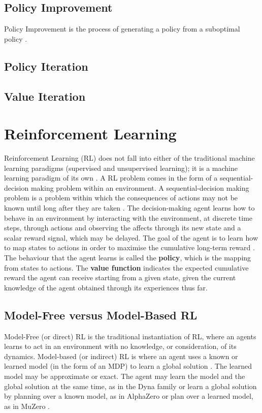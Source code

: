 \subsection{Policy Improvement}
Policy Improvement \cite{Bellman:1957} is the process of generating a policy from a suboptimal policy \cite{DBLP:books/lib/Bertsekas05}.
\subsection{Policy Iteration}
\cite{Bellman:1957, howard:dp}
\subsection{Value Iteration}
\cite{series/synthesis/2010Szepesvari}
\section{Reinforcement Learning}
Reinforcement Learning (RL) does not fall into either of the traditional machine learning paradigms (supervised and unsupervised learning); it is a machine learning paradigm of its own \cite{DBLP:journals/corr/cs-AI-9605103}.
A RL problem comes in the form of a sequential-decision making problem within an environment. A sequential-decision making problem is a problem within which the consequences of actions may not be known until long after they are taken \cite{barto1990learning}. The decision-making agent learns how to behave in an environment by interacting with the environment, at discrete time steps, through actions and observing the affects through its new state and a scalar reward signal, which may be delayed. The goal of the agent is to learn how to map states to actions in order to maximise the cumulative long-term reward \cite{Sutton1998}. The behaviour that the agent learns is called the \textbf{policy}, which is the mapping from states to actions. The \textbf{value function} indicates the expected cumulative reward the agent can receive starting from a given state, given the current knowledge of the agent obtained through its experiences thus far.

\subsection{Model-Free versus Model-Based RL}
Model-Free (or direct) RL is the traditional instantiation of RL, where an agents learns to act in an environment with no knowledge, or consideration, of its dynamics.
Model-based (or indirect) RL is where an agent uses a known or learned model (in the form of an MDP) to learn a global solution \cite{MAL-086}. The learned model may be approximate or exact. The agent may learn the model and the global solution at the same time, as in the Dyna family \cite{Sutton:1990, 10.1145/122344.122377} or learn a global solution by planning over a known model, as in AlphaZero \cite{DBLP:journals/corr/abs-1712-01815} or plan over a learned model, as in MuZero \cite{DBLP:journals/corr/abs-1911-08265}.

